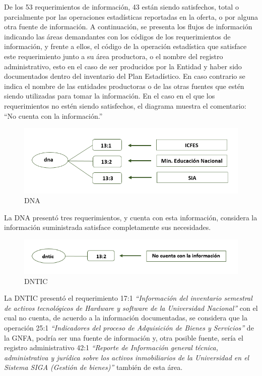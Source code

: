 \documentclass[
]{book}
\begin{document}
De los 53 requerimientos de información, 43 están siendo satisfechos, total o parcialmente por las
operaciones estadísticas reportadas en la oferta, o por alguna otra fuente de información. A continuación, se presenta los flujos de información indicando las áreas demandantes con los
códigos de los requerimientos de información, y frente a ellos, el código de la operación
estadística que satisface este requerimiento junto a su área productora, o el nombre del registro
administrativo, esto en el caso de ser producidos por la Entidad y haber sido documentados
dentro del inventario del Plan Estadístico. En caso contrario se indica el nombre de las entidades
productoras o de las otras fuentes que estén siendo utilizadas para tomar la información. En el
caso en el que los requerimientos no estén siendo satisfechos, el diagrama muestra el comentario:
``No cuenta con la información.''

\begin{figure}

{\centering \includegraphics[width=0.75\linewidth]{Imagenes/ima2} 

}

\caption{DNA}\label{fig:unnamed-chunk-30}
\end{figure}

La DNA presentó tres requerimientos, y cuenta con esta información, considera la información
suministrada satisface completamente sus necesidades.

\begin{figure}

{\centering \includegraphics[width=0.75\linewidth]{Imagenes/ima3} 

}

\caption{DNTIC}\label{fig:unnamed-chunk-31}
\end{figure}

La DNTIC presentó el requerimiento 17:1 \emph{``Información del inventario semestral de activos tecnológicos de Hardware y software de la Universidad Nacional''} con el cual no cuenta, de
acuerdo a la información documentadas, se considera que la operación 25:1 \emph{``Indicadores del proceso de Adquisición de Bienes y Servicios''} de la GNFA, podría ser una fuente de información y,
otra posible fuente, sería el registro administrativo 42:1 \emph{``Reporte de Información general técnica, administrativa y jurídica sobre los activos inmobiliarios de la Universidad en el Sistema SIGA (Gestión de bienes)''} también de esta área.
\end{document}
